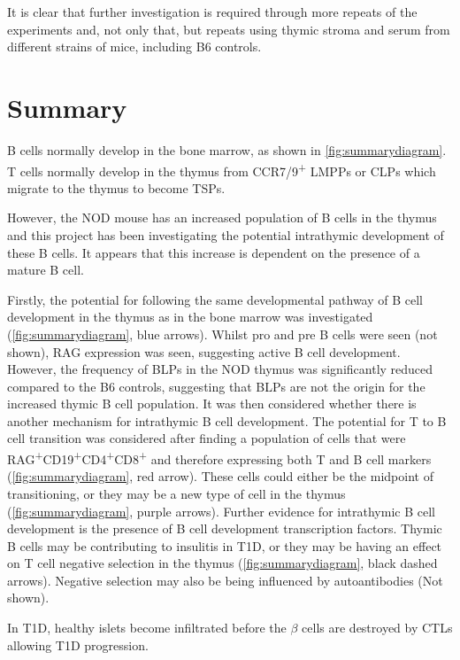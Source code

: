 It is clear that further investigation is required through more repeats of the experiments and, not only that, but repeats using thymic stroma and serum from different strains of mice, including B6 controls.





\section{Summary}

B cells normally develop in the bone marrow, as shown in \cref{fig:summarydiagram}.
T cells normally develop in the thymus from CCR7/9\textsuperscript{+} LMPPs or CLPs which migrate to the thymus to become TSPs.

However, the NOD mouse has an increased population of B cells in the thymus and this project has been investigating the potential intrathymic development of these B cells.
It appears that this increase is dependent on the presence of a mature B cell.

Firstly, the potential for following the same developmental pathway of B cell development in the thymus as in the bone marrow was investigated (\cref{fig:summarydiagram}, blue arrows).
Whilst pro and pre B cells were seen (not shown), RAG expression was seen, suggesting active B cell development.
However, the frequency of BLPs in the NOD thymus was significantly reduced compared to the B6 controls, suggesting that BLPs are not the origin for the increased thymic B cell population.
It was then considered whether there is another mechanism for intrathymic B cell development.
The potential for T to B cell transition was considered after finding a population of cells that were RAG\textsuperscript{+}CD19\textsuperscript{+}CD4\textsuperscript{+}CD8\textsuperscript{+} and therefore expressing both T and B cell markers (\cref{fig:summarydiagram}, red arrow).
These cells could either be the midpoint of transitioning, or they may be a new type of cell in the thymus (\cref{fig:summarydiagram}, purple arrows).
Further evidence for intrathymic B cell development is the presence of B cell development transcription factors.
Thymic B cells may be contributing to insulitis in T1D, or they may be having an effect on T cell negative selection in the thymus (\cref{fig:summarydiagram}, black dashed arrows).
Negative selection may also be being influenced by autoantibodies (Not shown).

In T1D, healthy islets become infiltrated before the $\beta$ cells are destroyed by CTLs allowing T1D progression.


